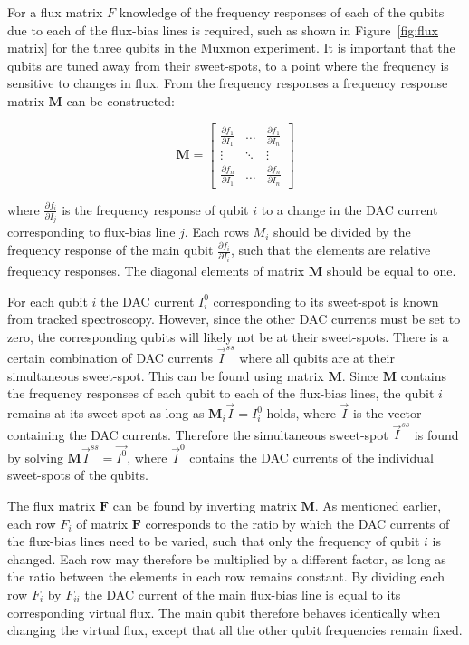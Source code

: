         For a flux matrix $F$ knowledge of the frequency responses of each of the qubits due to each of the flux-bias lines is required, such as shown in Figure~\ref{fig:flux matrix} for the three qubits in the Muxmon experiment. It is important that the qubits are tuned away from their sweet-spots, to a point where the frequency is sensitive to changes in flux. From the frequency responses a frequency response matrix $\boldsymbol{M}$ can be constructed:

        \begin{equation}
          \boldsymbol{M} =
          \begin{bmatrix}
            \frac{\partial f_1}{\partial I_1} & \dots & \frac{\partial f_1}{\partial I_n} \\
            \vdots & \ddots & \vdots \\
            \frac{\partial f_n}{\partial I_1} & \dots & \frac{\partial f_n}{\partial I_n}
          \end{bmatrix}
        \end{equation}

        where $\frac{\partial f_i}{\partial I_j}$ is the frequency response of qubit $i$ to a change in the DAC current corresponding to flux-bias line $j$. Each rows $M_i$ should be divided by the frequency response of the main qubit $\frac{\partial f_i}{\partial I_i}$, such that the elements are relative frequency responses. The diagonal elements of matrix $\boldsymbol{M}$ should be equal to one.

        For each qubit $i$ the DAC current $I^0_i$ corresponding to its sweet-spot is known from tracked spectroscopy. However, since the other DAC currents must be set to zero, the corresponding qubits will likely not be at their sweet-spots. There is a certain combination of DAC currents $\vec{I}^{ss}$ where all qubits are at their simultaneous sweet-spot. This can be found using matrix $\boldsymbol{M}$. Since $\boldsymbol{M}$ contains the frequency responses of each qubit to each of the flux-bias lines, the qubit $i$ remains at its sweet-spot as long as $\boldsymbol{M}_i \vec{I}=I^0_i$ holds, where $\vec{I}$ is the vector containing the DAC currents. Therefore the simultaneous sweet-spot $\vec{I}^{ss}$ is found by solving $\boldsymbol{M} \vec{I}^{ss} = \vec{I^0}$, where $\vec{I}^0$ contains the DAC currents of the individual sweet-spots of the qubits.

        The flux matrix $\boldsymbol{F}$ can be found by inverting matrix $\boldsymbol{M}$. As mentioned earlier, each row $F_i$ of matrix $\boldsymbol{F}$ corresponds to the ratio by which the DAC currents of the flux-bias lines need to be varied, such that only the frequency of qubit $i$ is changed. Each row may therefore be multiplied by a different factor, as long as the ratio between the elements in each row remains constant. By dividing each row $F_i$ by $F_{ii}$ the DAC current of the main flux-bias line is equal to its corresponding virtual flux. The main qubit therefore behaves identically when changing the virtual flux, except that all the other qubit frequencies remain fixed.

